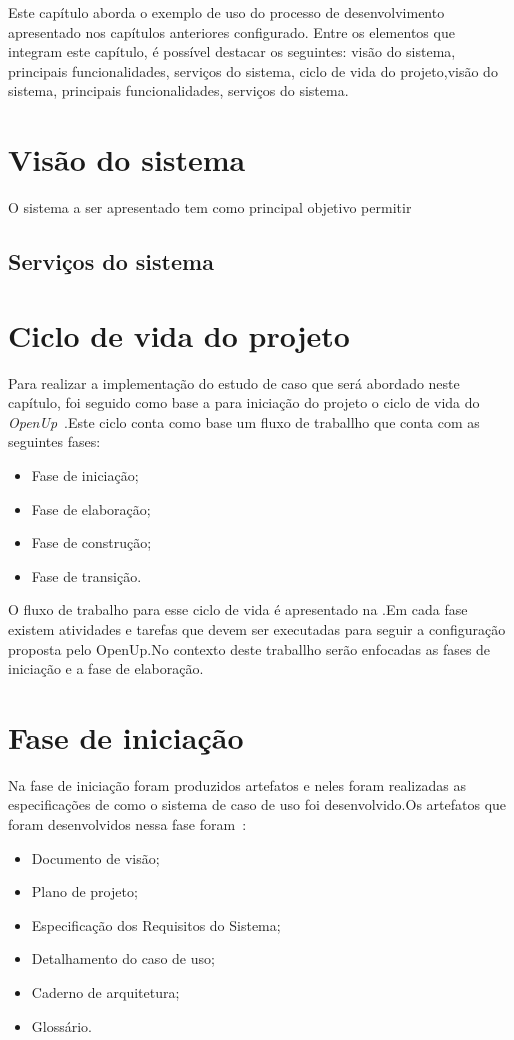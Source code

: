 Este capítulo aborda o exemplo de uso do processo de desenvolvimento apresentado nos capítulos anteriores configurado. Entre os elementos que integram este capítulo, é possível destacar os seguintes: visão do sistema, principais funcionalidades, serviços do sistema, ciclo de vida do projeto,visão do sistema, principais funcionalidades, serviços do sistema.

\section{Visão do sistema}

O sistema a ser apresentado tem como principal objetivo permitir 
\subsection{Serviços do sistema}

\section{Ciclo de vida do projeto}

Para realizar a implementação do estudo de caso que será abordado neste capítulo, foi seguido como base a para iniciação do projeto o ciclo de vida do \emph{OpenUp}~\cite{openup}.Este ciclo conta como base um fluxo de traballho que conta com as seguintes fases:
\begin{itemize}
    \item Fase de iniciação;
    \item Fase de elaboração;
    \item Fase de construção;
    \item Fase de transição.
\end{itemize}

%

O fluxo de trabalho para esse ciclo de vida é apresentado na .Em cada fase existem atividades e tarefas que devem ser executadas para seguir a configuração proposta pelo OpenUp.No contexto deste traballho serão enfocadas as fases de iniciação e a fase de elaboração.

\section{Fase de iniciação}

Na fase de iniciação foram produzidos artefatos e neles foram realizadas as especificações de como o sistema de caso de uso foi desenvolvido.Os artefatos que foram desenvolvidos nessa fase foram~\cite{openup}:
\begin{itemize}
    \item Documento de visão;
    \item Plano de projeto;
    \item Especificação dos Requisitos do Sistema;
    \item Detalhamento do caso de uso;
    \item Caderno de arquitetura;
    \item Glossário.
\end{itemize}
